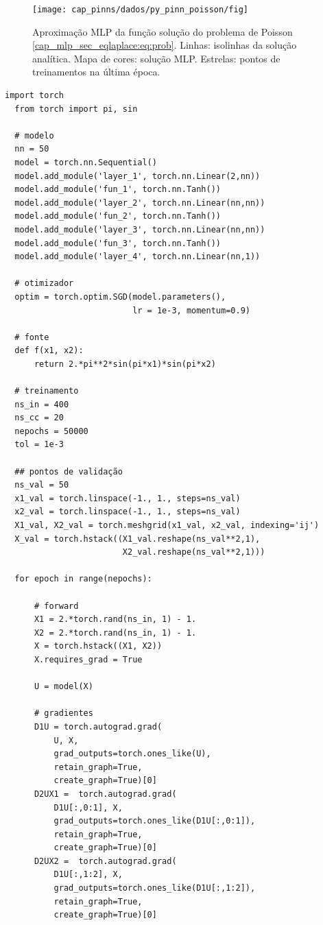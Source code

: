 \begin{figure}[H]
  \centering
  \texttt{[image: cap\_pinns/dados/py\_pinn\_poisson/fig]}
  \caption{Aproximação MLP da função solução do problema de Poisson \eqref{cap_mlp_sec_eqlaplace:eq:prob}. Linhas: isolinhas da solução analítica. Mapa de cores: solução MLP. Estrelas: pontos de treinamentos na última época.}
  \label{fig:mlp_apfun_2d}
\end{figure}



\begin{lstlisting}[caption=py\_pinn\_poisson]
  import torch
  from torch import pi, sin
  
  # modelo
  nn = 50
  model = torch.nn.Sequential()
  model.add_module('layer_1', torch.nn.Linear(2,nn))
  model.add_module('fun_1', torch.nn.Tanh())
  model.add_module('layer_2', torch.nn.Linear(nn,nn))
  model.add_module('fun_2', torch.nn.Tanh())
  model.add_module('layer_3', torch.nn.Linear(nn,nn))
  model.add_module('fun_3', torch.nn.Tanh())
  model.add_module('layer_4', torch.nn.Linear(nn,1))
  
  # otimizador
  optim = torch.optim.SGD(model.parameters(),
                          lr = 1e-3, momentum=0.9)
  
  # fonte
  def f(x1, x2):
      return 2.*pi**2*sin(pi*x1)*sin(pi*x2)
  
  # treinamento
  ns_in = 400
  ns_cc = 20
  nepochs = 50000
  tol = 1e-3
  
  ## pontos de validação
  ns_val = 50
  x1_val = torch.linspace(-1., 1., steps=ns_val)
  x2_val = torch.linspace(-1., 1., steps=ns_val)
  X1_val, X2_val = torch.meshgrid(x1_val, x2_val, indexing='ij')
  X_val = torch.hstack((X1_val.reshape(ns_val**2,1),
                        X2_val.reshape(ns_val**2,1)))
  
  for epoch in range(nepochs):
      
      # forward
      X1 = 2.*torch.rand(ns_in, 1) - 1.
      X2 = 2.*torch.rand(ns_in, 1) - 1.
      X = torch.hstack((X1, X2))
      X.requires_grad = True
      
      U = model(X)
      
      # gradientes
      D1U = torch.autograd.grad(
          U, X,
          grad_outputs=torch.ones_like(U),
          retain_graph=True,
          create_graph=True)[0]
      D2UX1 =  torch.autograd.grad(
          D1U[:,0:1], X,
          grad_outputs=torch.ones_like(D1U[:,0:1]),
          retain_graph=True,
          create_graph=True)[0]
      D2UX2 =  torch.autograd.grad(
          D1U[:,1:2], X,
          grad_outputs=torch.ones_like(D1U[:,1:2]),
          retain_graph=True,
          create_graph=True)[0]
      

\end{lstlisting}
